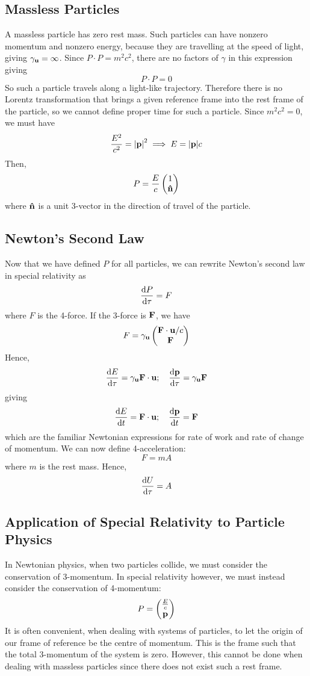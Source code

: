 \subsection{Massless Particles}
A massless particle has zero rest mass. Such particles can have nonzero momentum and nonzero energy, because they are travelling at the speed of light, giving $\gamma_{\vb u} = \infty$. Since $P \cdot P = m^2c^2$, there are no factors of $\gamma$ in this expression giving
\[ P \cdot P = 0 \]
So such a particle travels along a light-like trajectory. Therefore there is no Lorentz transformation that brings a given reference frame into the rest frame of the particle, so we cannot define proper time for such a particle. Since $m^2c^2 = 0$, we must have
\[ \frac{E^2}{c^2} = \abs{\vb p}^2 \implies E = \abs{\vb p}c \]
Then,
\[ P = \frac{E}{c} \begin{pmatrix}
		1 \\ \vu n
	\end{pmatrix} \]
where $\vu n$ is a unit 3-vector in the direction of travel of the particle.

\subsection{Newton's Second Law}
Now that we have defined $P$ for all particles, we can rewrite Newton's second law in special relativity as
\[ \dv{P}{\tau} = F \]
where $F$ is the 4-force. If the 3-force is $\vb F$, we have
\[ F = \gamma_{\vb u} \begin{pmatrix}
		\vb F \cdot \vb u / c \\
		\vb F
	\end{pmatrix} \]
Hence,
\[ \dv{E}{\tau} = \gamma_{\vb u} \vb F \cdot \vb u;\quad \dv{\vb p}{\tau} = \gamma_{\vb u} \vb F \]
giving
\[ \dv{E}{t} = \vb F \cdot \vb u;\quad \dv{\vb p}{t} = \vb F \]
which are the familiar Newtonian expressions for rate of work and rate of change of momentum. We can now define 4-acceleration:
\[ F = mA \]
where $m$ is the rest mass. Hence,
\[ \dv{U}{\tau} = A \]

\subsection{Application of Special Relativity to Particle Physics}
In Newtonian physics, when two particles collide, we must consider the conservation of 3-momentum. In special relativity however, we must instead consider the conservation of 4-momentum:
\[ P = \begin{pmatrix}
		\frac{E}{c} \\ \vb p
	\end{pmatrix} \]
It is often convenient, when dealing with systems of particles, to let the origin of our frame of reference be the centre of momentum. This is the frame such that the total 3-momentum of the system is zero. However, this cannot be done when dealing with massless particles since there does not exist such a rest frame.

